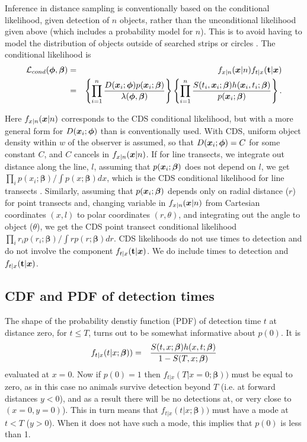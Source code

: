 \documentclass[useAMS,usenatbib,referee]{biom}
\begin{document}
Inference in distance sampling is conventionally based on the conditional likelihood, given detection of $n$ objects, rather than the unconditional likelihood given above (which includes a probability model for $n$). This is to avoid having to model the distribution of objects outside of searched strips or circles \citep{Borchers+Burnham:04}. The conditional likelihood is
\begin{eqnarray}
\mathcal{L}_{cond}({\bmt{\phi}},{\bmt{\beta}})
&=&f_{x|n}({\bmt{x}}|n)f_{t|x}({\bf t}|{\bmt{x}}) 
\nonumber \\
&=&
\left\{\prod^{n}_{i=1} \frac{D({\bmt{x}}_i;{\bmt{\phi}})p({\bmt{x}}_i;{\bmt{\beta}})}{\lambda({\bmt{\phi}},{\bmt{\beta}})}\right\}
\left\{\prod^{n}_{i=1}\frac{S(t_i,{\bmt{x}}_i;{\bmt{\beta}})h({\bmt{x}}_i,t_i;{\bmt{\beta}})}{p({\bmt{x}}_i;{\bmt{\beta}})}\right\}
\label{eq:cond.lik}.
\end{eqnarray}

Here $f_{x|n}({\mbox{\boldmath $x$}}|n)$ corresponds to the CDS conditional likelihood, but with a more general form for $D({\mbox{\boldmath $x$}}_i;{\mbox{\boldmath $\phi$}})$ than is conventionally used. With CDS, uniform object density within $w$ of the observer is assumed, so that $D({\mbox{\boldmath $x$}}_i;{\mbox{\boldmath $\phi$}})=C$ for some constant $C$, and $C$ cancels in $f_{x|n}({\mbox{\boldmath $x$}}|n)$. If for line transects, we integrate out distance along the line, $l$, assuming that $p({\mbox{\boldmath $x$}}_i;{\mbox{\boldmath $\beta$}})$ does not depend on $l$, we get $\prod_i p(x_i;\boldsymbol{\beta})/\int p(x;\boldsymbol{\beta})dx$, which is the CDS conditional likelihood for line transects \citep[see][]{Buckland+al:01}. Similarly, assuming that $p({\mbox{\boldmath $x$}}_i;{\mbox{\boldmath $\beta$}})$ depends only on radial distance ($r$) for point transects and, changing variable in $f_{x|n}({\mbox{\boldmath $x$}}|n)$ from Cartesian coordinates $(x,l)$ to polar coordinates $(r,\theta)$, and integrating out the angle to object ($\theta$), we get the CDS point transect conditional likelihood $\prod_i r_ip(r_i;\boldsymbol{\beta})/\int rp(r;\boldsymbol{\beta})dr$. CDS likelihoods do not use times to detection and do not involve the component $f_{t|x}({\bf t}|{\mbox{\boldmath $x$}})$. We do include times to detection and $f_{t|x}({\bf t}|{\mbox{\boldmath $x$}})$.


\subsection{CDF and PDF of detection times}

The shape of the probability denstiy function (PDF) of detection time $t$ at distance zero, for $t\leq T$, turns out to be somewhat informative about $p(0)$. It is 
\begin{eqnarray}
f_{t|x}(t|x;\boldsymbol{\beta}))&=&\frac{S(t,x;\boldsymbol{\beta})h(x,t;{\mbox{\boldmath $\beta$}})}{1-S(T,x;\boldsymbol{\beta})}
\end{eqnarray}
evaluated at $x=0$. Now if $p(0)=1$ then $f_{t|x}(T|x=0;\boldsymbol{\beta}))$ must be equal to zero, as in this case no animals survive detection beyond $T$ (i.e. at forward distances $y<0$), and as a result there will be no detections at, or very close to $(x=0,y=0)$). This in turn means that $f_{t|x}(t|x;\boldsymbol{\beta}))$ must have a mode at $t<T$ ($y>0$). When it does not have such a mode, this implies that $p(0)$ is less than 1. 
\end{document}
